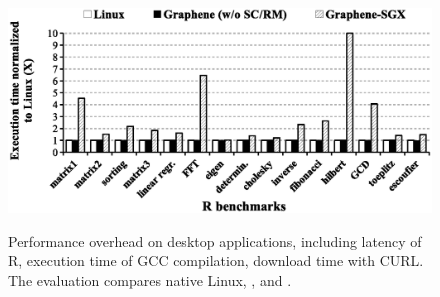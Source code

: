 

\begin{figure}[t!]
\centering
\footnotesize
\includegraphics[width=38em]{r-overhead}\\
\caption{Performance overhead on desktop applications, including latency of R, execution time of GCC compilation, download time with CURL. The evaluation compares native Linux, \graphene{}, and \graphenesgx{}.} %
\label{fig:eval:r-overheads}
\end{figure}



